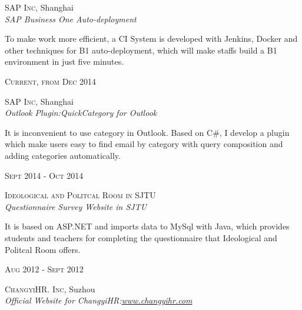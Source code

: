 \documentclass[UTF8,10pt]{article} %
\begin{document}
{\begin{minipage}[t]{0.5\textwidth}
{\raggedright\large \textsc{SAP Inc}, Shanghai\\
\textit{SAP Business One  Auto-deployment}\\[8pt]}

\normalsize{
To make work more efficient, a CI System is developed with Jenkins, Docker and other techniques for B1 auto-deployment, which will make staffs build a B1 environment in just five minutes. }\\


{\raggedleft\textsc{Current, from Dec 2014}\par}

{\raggedright\large \textsc{SAP Inc}, Shanghai\\
\textit{Outlook Plugin:QuickCategory for Outlook}\\[8pt]}

\normalsize{It is inconvenient to use category in Outlook. Based on C\#, I develop a plugin which make users easy to find email by category with query composition and adding categories  automatically. }\\


{\raggedleft\textsc{Sept 2014 - Oct 2014}\par}

{\raggedright\large \textsc{Ideological and Politcal Room in SJTU}\\
\textit{Questionnaire Survey Website in SJTU}\\[5pt]}

\normalsize{It is based on ASP.NET and  imports data to MySql with Java, which provides students and teachers for completing the questionnaire that Ideological and Politcal Room offers.}\\


{\raggedleft\textsc{Aug 2012 - Sept 2012}\par}

{\raggedright\large \textsc{ChangyiHR. Inc}, Suzhou\\
\textit{Official Website for ChangyiHR:\href{www.changyihr.com}{www.changyihr.com}}\\[5pt]}


\end{minipage}}
\end{document}
